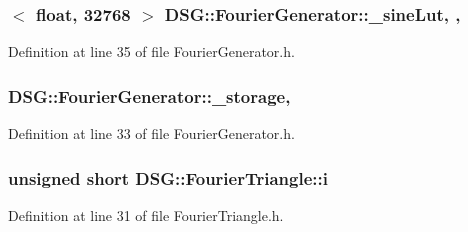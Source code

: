 \hypertarget{classDSG_1_1FourierGenerator_a1ae5fb243ce05e638bdf0dec8bde7426}{
\subsubsection[{\+\_\+sine\+Lut}]{$<$ float, 32768 $>$ D\+S\+G\+::\+Fourier\+Generator\+::\+\_\+sine\+Lut\hspace{0.3cm}{\ttfamily [static]}, {\ttfamily [protected]}, {\ttfamily [inherited]}}}\label{classDSG_1_1FourierGenerator_a1ae5fb243ce05e638bdf0dec8bde7426}


Definition at line 35 of file Fourier\+Generator.\+h.

\hypertarget{classDSG_1_1FourierGenerator_a6b7f2439b26914cc9df6b6975a2cedac}{
\subsubsection[{\+\_\+storage}]{ D\+S\+G\+::\+Fourier\+Generator\+::\+\_\+storage\hspace{0.3cm}{\ttfamily [protected]}, {\ttfamily [inherited]}}}\label{classDSG_1_1FourierGenerator_a6b7f2439b26914cc9df6b6975a2cedac}


Definition at line 33 of file Fourier\+Generator.\+h.

\hypertarget{classDSG_1_1FourierTriangle_a5e5749c6efba1470dfd136b50176d249}{
\subsubsection[{i}]{\setlength{\rightskip}{0pt plus 5cm}unsigned short D\+S\+G\+::\+Fourier\+Triangle\+::i\hspace{0.3cm}{\ttfamily [protected]}}}\label{classDSG_1_1FourierTriangle_a5e5749c6efba1470dfd136b50176d249}


Definition at line 31 of file Fourier\+Triangle.\+h.

